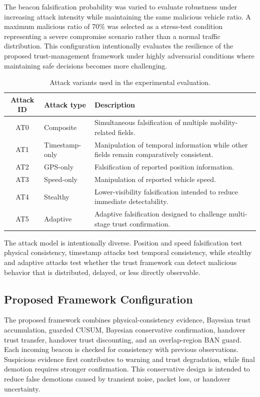 \documentclass[journal]{IEEEtran}
\begin{document}
The beacon falsification probability was varied to evaluate robustness under
increasing attack intensity while maintaining the same malicious vehicle
ratio. A maximum malicious ratio of 70\% was
selected as a stress-test condition representing a severe compromise
scenario rather than a normal traffic distribution. This configuration
intentionally evaluates the resilience of the proposed trust-management
framework under highly adversarial conditions where maintaining
safe decisions becomes more challenging.

\begin{table}[!t]
\centering
\caption{Attack variants used in the experimental evaluation.}
\label{tab:attack_variants}
\begin{tabularx}{\columnwidth}{c l X}
\toprule
\textbf{Attack ID} & \textbf{Attack type} & \textbf{Description} \\
\midrule
AT0 & Composite & Simultaneous falsification of multiple mobility-related fields. \\
AT1 & Timestamp-only & Manipulation of temporal information while other fields remain comparatively consistent. \\
AT2 & GPS-only & Falsification of reported position information. \\
AT3 & Speed-only & Manipulation of reported vehicle speed. \\
AT4 & Stealthy & Lower-visibility falsification intended to reduce immediate detectability. \\
AT5 & Adaptive & Adaptive falsification designed to challenge multi-stage trust confirmation. \\
\bottomrule
\end{tabularx}
\end{table}

The attack model is intentionally diverse. Position and speed falsification test physical consistency, timestamp attacks test temporal consistency, while stealthy and adaptive attacks test whether the trust framework can detect malicious behavior that is distributed, delayed, or less directly observable.

\subsection{Proposed Framework Configuration}
\label{subsec:framework_configuration}

The proposed framework combines physical-consistency evidence, Bayesian trust accumulation, guarded CUSUM, Bayesian conservative confirmation, handover trust transfer, handover trust discounting, and an overlap-region BAN guard. Each incoming beacon is checked for consistency with previous observations. Suspicious evidence first contributes to warning and trust degradation, while final demotion requires stronger confirmation. This conservative design is intended to reduce false demotions caused by transient noise, packet loss, or handover uncertainty.
\end{document}
